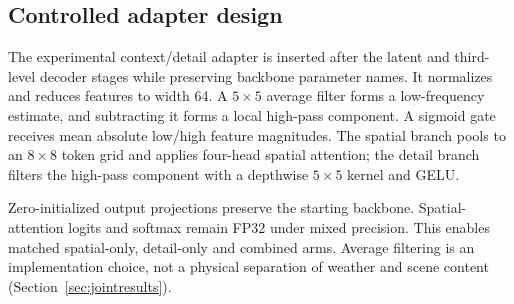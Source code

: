 \subsection{Controlled adapter design}
The experimental context/detail adapter is inserted after the latent and
third-level decoder stages while preserving backbone parameter names.
It normalizes and reduces features to width 64. A $5\times5$ average filter
forms a low-frequency estimate, and subtracting it forms a local high-pass
component. A sigmoid gate receives mean absolute low/high feature magnitudes.
The spatial branch pools to an $8\times8$ token grid and applies four-head
spatial attention; the detail branch filters the high-pass component with
a depthwise $5\times5$ kernel and GELU.

Zero-initialized output projections preserve the starting backbone.
Spatial-attention logits and softmax remain FP32 under mixed precision.
This enables matched spatial-only, detail-only and combined arms. Average
filtering is an implementation choice, not a physical separation of weather
and scene content (Section~\ref{sec:jointresults}).
